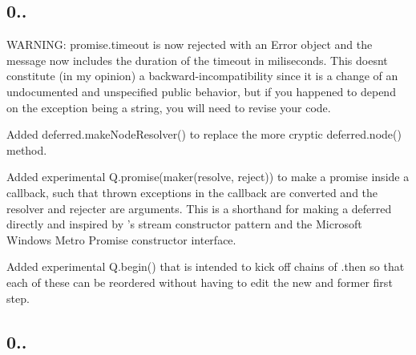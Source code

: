 \subsection*{0..}


\begin{DoxyItemize}
\item W\+A\+R\+N\+I\+NG\+: {\ttfamily promise.\+timeout} is now rejected with an {\ttfamily Error} object and the message now includes the duration of the timeout in miliseconds. This doesn\textquotesingle{}t constitute (in my opinion) a backward-\/incompatibility since it is a change of an undocumented and unspecified public behavior, but if you happened to depend on the exception being a string, you will need to revise your code.
\item Added {\ttfamily deferred.\+make\+Node\+Resolver()} to replace the more cryptic {\ttfamily deferred.\+node()} method.
\item Added experimental {\ttfamily Q.\+promise(maker(resolve, reject))} to make a promise inside a callback, such that thrown exceptions in the callback are converted and the resolver and rejecter are arguments. This is a shorthand for making a deferred directly and inspired by ’s stream constructor pattern and the Microsoft Windows Metro Promise constructor interface.
\item Added experimental {\ttfamily Q.\+begin()} that is intended to kick off chains of {\ttfamily .then} so that each of these can be reordered without having to edit the new and former first step.
\end{DoxyItemize}

\subsection*{0..}


